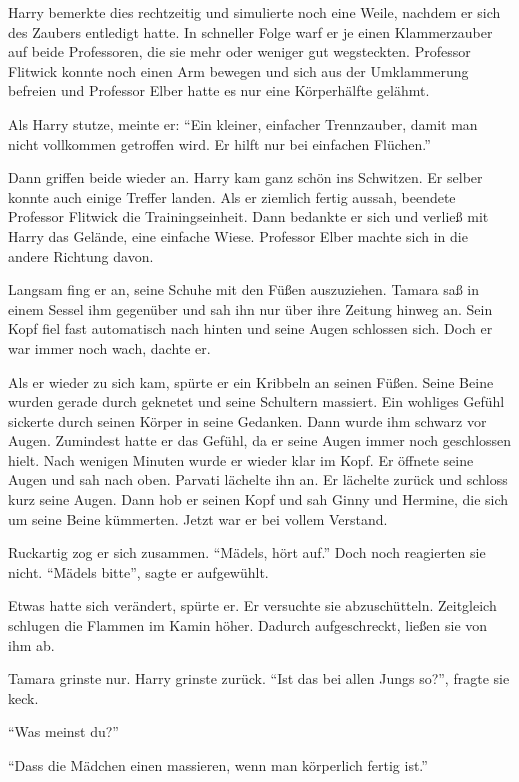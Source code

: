 \begin{rueckblick}
Harry bemerkte dies rechtzeitig und simulierte noch eine Weile, nachdem er sich des Zaubers entledigt hatte. In schneller Folge warf er je einen Klammerzauber auf beide Professoren, die sie mehr oder weniger gut wegsteckten. Professor Flitwick konnte noch einen Arm bewegen und sich aus der Umklammerung befreien und Professor Elber hatte es nur eine Körperhälfte gelähmt.

Als Harry stutze, meinte er: \enquote{Ein kleiner, einfacher Trennzauber, damit man nicht vollkommen getroffen wird. Er hilft nur bei einfachen Flüchen.}

Dann griffen beide wieder an. Harry kam ganz schön ins Schwitzen. Er selber konnte auch einige Treffer landen. Als er ziemlich fertig  aussah, beendete Professor Flitwick die Trainingseinheit. Dann bedankte er sich und verließ mit Harry das Gelände, eine einfache Wiese. Professor Elber machte sich in die andere Richtung davon.
\end{rueckblick}

Langsam fing er an, seine Schuhe mit den Füßen auszuziehen. Tamara saß in einem Sessel ihm gegenüber und sah ihn nur über ihre Zeitung hinweg an. Sein Kopf fiel fast automatisch nach hinten und seine Augen schlossen sich. Doch er war immer noch wach, dachte er.

Als er wieder zu sich kam, spürte er ein Kribbeln an seinen Füßen. Seine Beine wurden gerade durch geknetet und seine Schultern massiert. Ein wohliges Gefühl sickerte durch seinen Körper in seine Gedanken. Dann wurde ihm schwarz vor Augen. Zumindest hatte er das Gefühl, da er seine Augen immer noch geschlossen hielt. Nach wenigen Minuten wurde er wieder klar im Kopf. Er öffnete seine Augen und sah nach oben. Parvati lächelte ihn an. Er lächelte zurück und schloss kurz seine Augen. Dann hob er seinen Kopf und sah Ginny und Hermine, die sich um seine Beine kümmerten. Jetzt war er bei vollem Verstand.

Ruckartig zog er sich zusammen. \enquote{Mädels, hört auf.} Doch noch reagierten sie nicht. \enquote{Mädels bitte}, sagte er aufgewühlt.

Etwas hatte sich verändert, spürte er. Er versuchte sie abzuschütteln. Zeitgleich schlugen die Flammen im Kamin höher. Dadurch aufgeschreckt, ließen sie von ihm ab.

Tamara grinste nur. Harry grinste zurück. \enquote{Ist das bei allen Jungs so?}, fragte sie keck.

\enquote{Was meinst du?}

\enquote{Dass die Mädchen einen massieren, wenn man körperlich fertig ist.}

